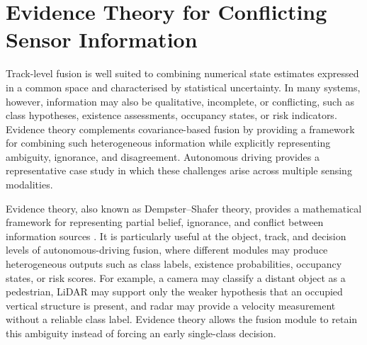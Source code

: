 \documentclass[graybox,envcountchap]{style/SNmono}
\begin{document}
\section{Evidence Theory for Conflicting Sensor Information}
\label{sec:evidence}



Track-level fusion is well suited to combining numerical state estimates expressed in a common space and characterised by statistical uncertainty. In many systems, however, information may also be qualitative, incomplete, or conflicting, such as class hypotheses, existence assessments, occupancy states, or risk indicators. Evidence theory complements covariance-based fusion by providing a framework for combining such heterogeneous information while explicitly representing ambiguity, ignorance, and disagreement. Autonomous driving provides a representative case study in which these challenges arise across multiple sensing modalities.

Evidence theory, also known as Dempster--Shafer theory, provides a mathematical framework for representing partial belief, ignorance, and conflict between information sources \cite{shafer_mathematical_1976,dempster_upperlower_2008,smets_transferable_1990}. It is particularly useful at the object, track, and decision levels of autonomous-driving fusion, where different modules may produce heterogeneous outputs such as class labels, existence probabilities, occupancy states, or risk scores. For example, a camera may classify a distant object as a pedestrian, LiDAR may support only the weaker hypothesis that an occupied vertical structure is present, and radar may provide a velocity measurement without a reliable class label. Evidence theory allows the fusion module to retain this ambiguity instead of forcing an early single-class decision.
\end{document}
